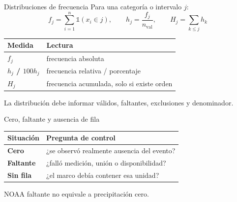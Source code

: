 \documentclass[aspectratio=169,11pt]{beamer}
\newcommand{\br}{\\}
\begin{document}
\begin{frame}{Distribuciones de frecuencia}
  \small
  Para una categoría o intervalo $j$:
  \[
    f_j=\sum_{i=1}^{n}\mathbb{1}(x_i\in j),\qquad
    h_j=\frac{f_j}{n_{\mathrm{val}}},\qquad
    H_j=\sum_{k\leq j}h_k
  \]
  \begin{tabularx}{\textwidth}{>{\bfseries}p{} X}
    \toprule
    Medida & Lectura \\
    \midrule
    $f_j$ & frecuencia absoluta \\
    $h_j$ / $100h_j$ & frecuencia relativa / porcentaje \\
    $H_j$ & frecuencia acumulada, solo si existe orden \\
    \bottomrule
  \end{tabularx}
  \vfill
  \centering La distribución debe informar válidos, faltantes, exclusiones y denominador.
\end{frame}

\begin{frame}{Cero, faltante y ausencia de fila}
  \small
  \centering
  \vspace{.6em}
  \begin{tabularx}{\textwidth}{>{\bfseries}p{} X}
    \toprule
    Situación & Pregunta de control \\
    \midrule
    Cero & ¿se observó realmente ausencia del evento? \\
    Faltante & ¿falló medición, unión o disponibilidad? \\
    Sin fila & ¿el marco debía contener esa unidad? \\
    \bottomrule
  \end{tabularx}
  \par\alert{NOAA faltante no equivale a precipitación cero.}
\end{frame}
\end{document}
